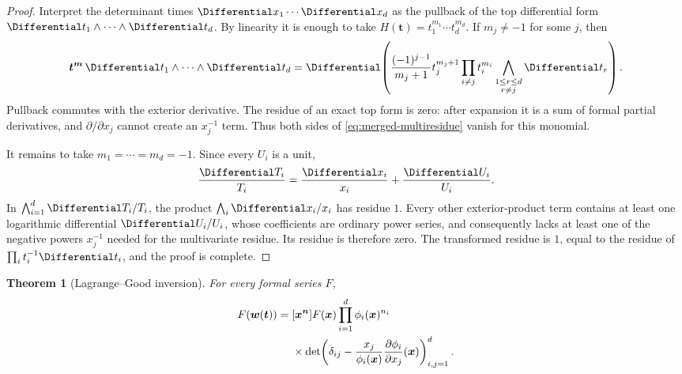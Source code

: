 \documentclass[11pt,a4paper,oneside,openany]{book}
\newtheorem{theorem}{Theorem}[chapter]
\theoremstyle{definition}
\theoremstyle{remark}
\begin{document}
\begin{proof}
Interpret the determinant times $\Differential x_1\cdots\Differential x_d$ as the pullback of
the top differential form $\Differential t_1\wedge\cdots\wedge\Differential t_d$.  By linearity
it is enough to take
$H(\bm t)=t_1^{m_1}\cdots t_d^{m_d}$.  If $m_j\ne-1$ for some $j$, then
\[
 \bm t^{\bm m}\,\Differential t_1\wedge\cdots\wedge\Differential t_d
 =\Differential\!\left(
   \frac{(-1)^{j-1}}{m_j+1}
   t_j^{m_j+1}\prod_{i\ne j}t_i^{m_i}
   \bigwedge_{\substack{1\le r\le d\\ r\ne j}}\Differential t_r\right).
\]
Pullback commutes with the exterior derivative.  The residue of an exact top
form is zero: after expansion it is a sum of formal partial derivatives, and
$\partial/\partial x_j$ cannot create an $x_j^{-1}$ term.  Thus both sides of
\eqref{eq:merged-multiresidue} vanish for this monomial.

It remains to take $m_1=\cdots=m_d=-1$.  Since every $U_i$ is a unit,
\[
 \frac{\Differential T_i}{T_i}=\frac{\Differential x_i}{x_i}+\frac{\Differential U_i}{U_i}.
\]
In
$\bigwedge_{i=1}^{d}\Differential T_i/T_i$, the product
$\bigwedge_i\Differential x_i/x_i$ has residue $1$.  Every other exterior-product term
contains at least one logarithmic differential $\Differential U_i/U_i$, whose
coefficients are ordinary power series, and consequently lacks at least one
of the negative powers $x_j^{-1}$ needed for the multivariate residue.  Its
residue is therefore zero.  The transformed residue is $1$, equal to the
residue of $\prod_i t_i^{-1}\Differential t_i$, and the proof is complete.
\end{proof}

\begin{theorem}[Lagrange--Good inversion]
\label{thm:merged-good}
For every formal series $F$,
\begin{align}
 [\bm t^{\bm n}]F(\bm w(\bm t))
 ={}&[\bm x^{\bm n}]F(\bm x)\prod_{i=1}^{d}\phi_i(\bm x)^{n_i}       \notag\\
 &\times\det\!\left(
 \delta_{ij}-\frac{x_j}{\phi_i(\bm x)}
                  \frac{\partial\phi_i}{\partial x_j}(\bm x)
 \right)_{i,j=1}^{d}.                                               \label{eq:merged-good}
\end{align}
\end{theorem}
\end{document}
